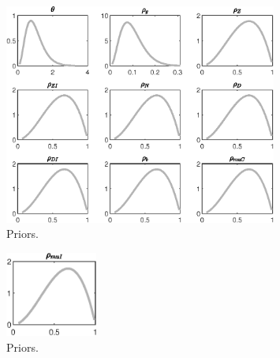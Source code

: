 \begin{figure}[H]
\centering
\includegraphics[width=0.80\textwidth]{BRS_sectoral/graphs/BRS_sectoral_Priors4}
\caption{Priors.}\label{Fig:Priors:4}
\end{figure}
\begin{figure}[H]
\centering
\includegraphics[width=0.27\textwidth]{BRS_sectoral/graphs/BRS_sectoral_Priors5}
\caption{Priors.}\label{Fig:Priors:5}
\end{figure}
 
